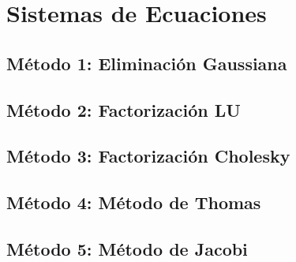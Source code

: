\documentclass[10pt,a4paper]{article}
\begin{document}
	\section{Sistemas de Ecuaciones}
	
	\subsection{Método 1: Eliminación Gaussiana}
	
	

	\subsection{Método 2: Factorización LU}
	
	
	
	\subsection{Método 3: Factorización Cholesky}
	
	

	\subsection{Método 4: Método de Thomas}
	
	
				
	\subsection{Método 5: Método de Jacobi}
	
		
					
\end{document}
